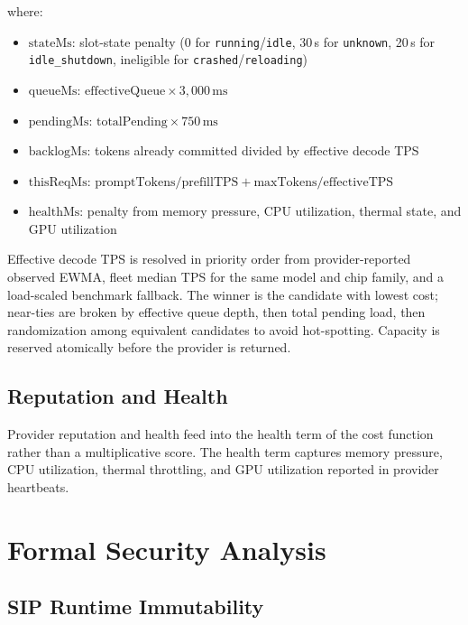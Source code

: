 \documentclass[10pt,twocolumn,letterpaper]{article}
\begin{document}
where:
\begin{itemize}[leftmargin=*,itemsep=1pt]
    \item $\text{stateMs}$: slot-state penalty (0 for \texttt{running}/\texttt{idle}, 30\,s for \texttt{unknown}, 20\,s for \texttt{idle\_shutdown}, ineligible for \texttt{crashed}/\texttt{reloading})
    \item $\text{queueMs}$: $\text{effectiveQueue} \times 3{,}000\,\text{ms}$
    \item $\text{pendingMs}$: $\text{totalPending} \times 750\,\text{ms}$
    \item $\text{backlogMs}$: tokens already committed divided by effective decode TPS
    \item $\text{thisReqMs}$: $\text{promptTokens}/\text{prefillTPS} + \text{maxTokens}/\text{effectiveTPS}$
    \item $\text{healthMs}$: penalty from memory pressure, CPU utilization, thermal state, and GPU utilization
\end{itemize}

Effective decode TPS is resolved in priority order from provider-reported observed EWMA, fleet median TPS for the same model and chip family, and a load-scaled benchmark fallback. The winner is the candidate with lowest cost; near-ties are broken by effective queue depth, then total pending load, then randomization among equivalent candidates to avoid hot-spotting. Capacity is reserved atomically before the provider is returned.

\subsection{Reputation and Health}

Provider reputation and health feed into the health term of the cost function rather than a multiplicative score. The health term captures memory pressure, CPU utilization, thermal throttling, and GPU utilization reported in provider heartbeats.

\section{Formal Security Analysis}
\label{sec:formal}

\subsection{SIP Runtime Immutability}
\label{sec:sip}
\end{document}
